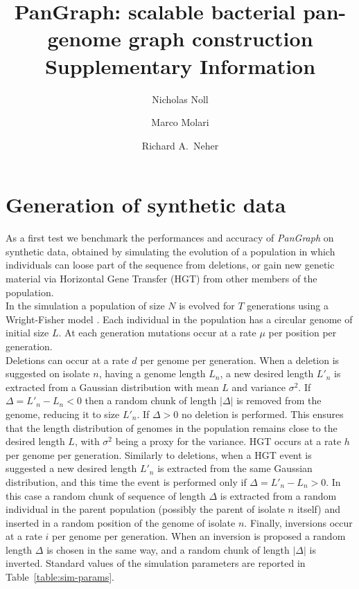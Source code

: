 \documentclass[aps,rmp,reprint,superscriptaddress,notitlepage,10pt,onecolumn]{revtex4-1}
\begin{document}
\title{PanGraph: scalable bacterial pan-genome graph construction \\ Supplementary Information}
\author{Nicholas Noll}
\author{Marco Molari}
\author{Richard A.~Neher}

\maketitle

\section{Generation of synthetic data}

As a first test we benchmark the performances and accuracy of \textit{PanGraph} on synthetic data, obtained by simulating the evolution of a population in which individuals can loose part of the sequence from deletions, or gain new genetic material via Horizontal Gene Transfer (HGT) from other members of the population.\\
In the simulation a population of size $N$ is evolved for $T$ generations using a Wright-Fisher model \cite{hudson2002generating}. Each individual in the population has a circular genome of initial size $L$. At each generation mutations occur at a rate $\mu$ per position per generation.\\
Deletions can occur at a rate $d$ per genome per generation. When a deletion is suggested on isolate $n$, having a genome length $L_n$, a new desired length $L'_n$ is extracted from a Gaussian distribution with mean $L$ and variance $\sigma^2$. If $\Delta = L'_n - L_n < 0$ then a random chunk of length $|\Delta|$ is removed from the genome, reducing it to size $L'_n$. If $\Delta > 0$ no deletion is performed. This ensures that the length distribution of genomes in the population remains close to the desired length $L$, with $\sigma^2$ being a proxy for the variance.
HGT occurs at a rate $h$ per genome per generation. Similarly to deletions, when a HGT event is suggested a new desired length $L'_n$ is extracted from the same Gaussian distribution, and this time the event is performed only if $\Delta = L'_n - L_n > 0$. In this case a random chunk of sequence of length $\Delta$ is extracted from a random individual in the parent population (possibly the parent of isolate $n$ itself) and inserted in a random position of the genome of isolate $n$.
Finally, inversions occur at a rate $i$ per genome per generation. When an inversion is proposed a random length $\Delta$ is chosen in the same way, and a random chunk of length $|\Delta|$ is inverted.
Standard values of the simulation parameters are reported in Table~\ref{table:sim-params}.
\end{document}
